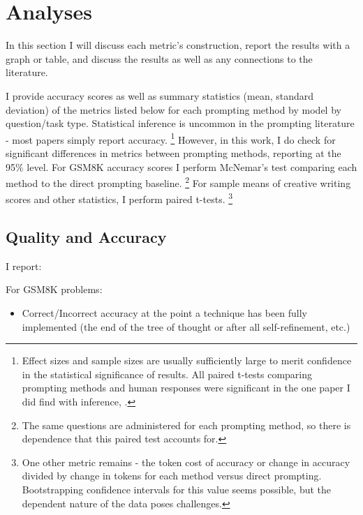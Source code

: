\documentclass[11pt]{article}
\begin{document}
\section*{Analyses}

In this section I will discuss each metric's construction, report the results with a graph or table, and discuss the results as well as any connections to the literature.

I provide accuracy scores as well as summary statistics (mean, standard deviation) of the metrics listed below for each prompting method by model by question/task type. Statistical inference is uncommon in the prompting literature - most papers simply report accuracy. \footnote{Effect sizes and sample sizes are usually sufficiently large to merit confidence in the statistical significance of results. All paired t-tests comparing prompting methods and human responses were significant in the one paper I did find with inference, \citealp{pu_chatgpt_2023}.} However, in this work, I do check for significant differences in metrics between prompting methods, reporting at the 95\% level. For GSM8K accuracy scores I perform McNemar's test comparing each method to the direct prompting baseline. \footnote{The same questions are administered for each prompting method, so there is dependence that this paired test accounts for.} For sample means of creative writing scores and other statistics, I perform paired t-tests. \footnote{One other metric remains - the token cost of accuracy or change in accuracy divided by change in tokens for each method versus direct prompting. Bootstrapping confidence intervals for this value seems possible, but the dependent nature of the data poses challenges.}

\subsection*{Quality and Accuracy}

I report:

For GSM8K problems:
\begin{itemize}
  \item Correct/Incorrect accuracy at the point a technique has been fully implemented (the end of the tree of thought or after all self-refinement, etc.)
\end{itemize}
\end{document}
